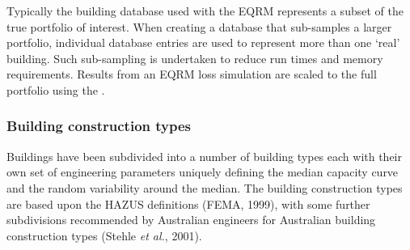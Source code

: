 Typically the building database used with
the EQRM represents a subset of the true portfolio of interest.
When creating a database that sub-samples a larger portfolio,
individual database entries are used to represent more than one
`real' building. Such sub-sampling is undertaken to reduce run
times and memory requirements. Results from an EQRM  loss 
simulation are scaled to the full portfolio using the \typesf. 


\subsubsection{Building construction types}
\label{sec:grids-constructionclass}

Buildings have been subdivided into a number of building
types each with their own set of engineering
parameters uniquely defining the median capacity
curve and the random variability around the
median. The building construction types are
based upon the HAZUS definitions (FEMA, 1999),%
with some further subdivisions recommended by Australian engineers for
Australian building construction types (Stehle \textit{et al.}, 2001).%

